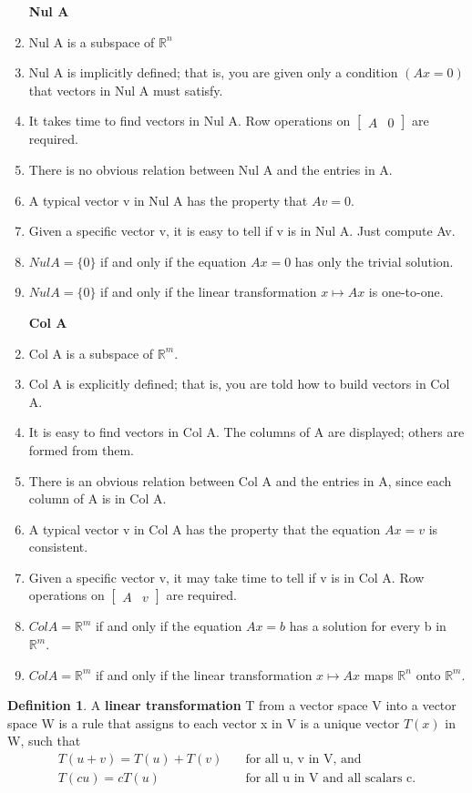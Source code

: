 \documentclass[12pt]{article}
\theoremstyle{definition}
\newtheorem{definition}{Definition} %
\numberwithin{equation}{theorem}    %
\newcommand{\drawvec}[1]{                    %
    \begin{bmatrix}
        #1
    \end{bmatrix}
}
\begin{document}
\begin{enumerate}
    \item [\textbf{Nul A}]
    \item Nul A is a subspace of $\mathbb{R}^n$
    \item Nul A is implicitly defined; that is, you are given only a condition $(Ax=0)$ that vectors in Nul A must satisfy.
    \item It takes time to find vectors in Nul A. Row operations on $\drawvec{A & 0}$ are required.
    \item There is no obvious relation between Nul A and the entries in A.
    \item A typical vector v in Nul A has the property that $Av=0$.
    \item Given a specific vector v, it is easy to tell if v is in Nul A. Just compute Av.
    \item $Nul A=\{0\}$ if and only if the equation $Ax=0$ has only the trivial solution.
    \item $Nul A=\{0\}$ if and only if the linear transformation $x\mapsto Ax$ is one-to-one.
\end{enumerate}

\begin{enumerate}
    \item [\textbf{Col A}]
    \item Col A is a subspace of $\mathbb{R}^m$.
    \item Col A is explicitly defined; that is, you are told how to build vectors in Col A.
    \item It is easy to find vectors in Col A. The columns of A are displayed; others are formed from them.
    \item There is an obvious relation between Col A and the entries in A, since each column of A is in Col A. 
    \item A typical vector v in Col A has the property that the equation $Ax=v$ is consistent.
    \item Given a specific vector v, it may take time to tell if v is in Col A. Row operations on $\drawvec{A & v}$ are required.
    \item $Col A=\mathbb{R}^m$ if and only if the equation $Ax=b$ has a solution for every b in $\mathbb{R}^m$.
    \item $Col A=\mathbb{R}^m$ if and only if the linear transformation $x \mapsto Ax$ maps $\mathbb{R}^n$ onto $\mathbb{R}^m$.
\end{enumerate}

\begin{definition}
    A \textbf{linear transformation} T from a vector space V into a vector space W is a rule that assigns to each vector x in V is a unique vector $T(x)$ in W, such that
    \begin{align}
        T(u+v) = T(u) + T(v) &\quad \text{for all u, v in V, and} \\
        T(cu) = cT(u) &\quad \text{for all u in V and all scalars c.}
    \end{align}
\end{definition}
\end{document}
